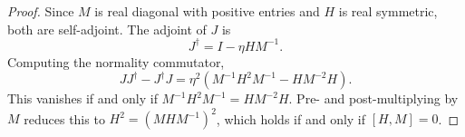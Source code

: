 \documentclass[10pt,a4paper]{amsart}
\begin{document}
\begin{proof}
Since $M$ is real diagonal with positive entries and $H$ is real
symmetric, both are self-adjoint.
The adjoint of $J$ is
\begin{equation}
J^\dagger = I - \eta H M^{-1}.
\label{eq:jadj}
\end{equation}
Computing the normality commutator,
\begin{equation}
JJ^\dagger - J^\dagger J
  = \eta^2\!\left(M^{-1}H^2M^{-1} - HM^{-2}H\right).
\label{eq:comm}
\end{equation}
This vanishes if and only if $M^{-1}H^2M^{-1} = HM^{-2}H$.
Pre- and post-multiplying by $M$ reduces this to
$H^2 = (MHM^{-1})^2$, which holds if and only if $[H,M] = 0$.
\end{proof}
\end{document}
